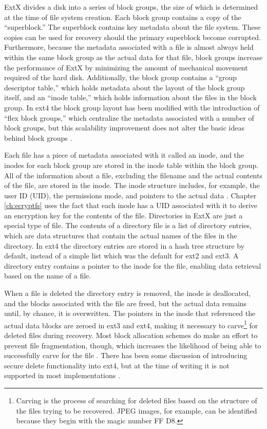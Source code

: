 ExtX divides a disk into a series of block groups, the size of which is determined at the time of file system creation.  Each block
group contains a copy of the ``superblock.'' The superblock contains key metadata about the file system.  These copies can be used
for recovery should the primary superblock become corrupted.  Furthermore, because the metadata associated with a file is almost
always held within the same block group as the actual data for that file, block groups increase the performance of ExtX by
minimizing the amount of mechanical movement required of the hard disk. Additionally, the block group contains a ``group descriptor
table,'' which holds metadata about the layout of the block group itself, and an ``inode table,'' which holds information about the
files in the block group. In ext4 the block group layout has been modified with the introduction of ``flex block groups,'' which
centralize the metadata associated with a number of block groups, but this scalability improvement does not alter the basic ideas
behind block groups \cite{ext4implications}.

Each file has a piece of metadata associated with it called an inode, and the inodes for each block group are stored in the inode
table within the block group. All of the information about a file, excluding the filename and the actual contents of the file, are
stored in the inode. The inode structure includes, for example, the user ID (UID), the permissions mode, and pointers to the actual
data \cite[p.  457]{carrier}. Chapter \ref{ch:ecryptfs} uses the fact that each inode has a UID associated with it to derive an
encryption key for the contents of the file. Directories in ExtX are just a special type of file. The contents of a directory file
is a list of directory entries, which are data structures that contain the actual names of the files in the directory. In ext4 the
directory entries are stored in a hash tree structure by default, instead of a simple list which was the default for ext2 and ext3.
A directory entry contains a pointer to the inode for the file, enabling data retrieval based on the name of a file. 

When a file is deleted the directory entry is removed, the inode is deallocated, and the blocks associated with the file are freed,
but the actual data remains until, by chance, it is overwritten. The pointers in the inode that referenced the actual
data blocks are zeroed in ext3 and ext4, making it necessary to carve\footnote{Carving is the process of searching
for deleted files based on the structure of the files trying to be recovered. JPEG images, for example, can be identified because
they begin with the magic number FF D8.} for deleted files during recovery.  Most block allocation schemes do make an effort to
prevent file fragmentation, though, which increases the likelihood of being able to successfully carve for the file
\cite{ext4implications}. There has been some discussion of introducing secure delete functionality into ext4, but at the
time of writing it is not supported in most implementations \cite{ext4securedelete}.

